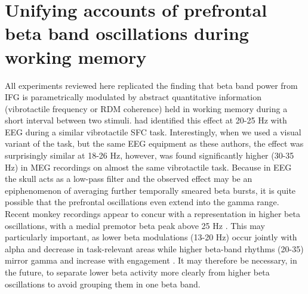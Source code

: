 \section{Unifying accounts of prefrontal beta band oscillations during working memory}

All experiments reviewed here replicated the finding that beta band power from IFG is parametrically modulated by abstract quantitative information (vibrotactile frequency or RDM coherence) held in working memory during a short interval between two stimuli. \textcite{Spitzer2010} had identified this effect at 20-25 Hz with EEG during a similar vibrotactile SFC task. Interestingly, when we used a visual variant of the task, but the same EEG equipment as these authors, the effect was surprisingly similar at 18-26 Hz, however, was found significantly higher (30-35 Hz) in MEG recordings on almost the same vibrotactile task. Because in EEG the skull acts as a low-pass filter \parencite{Pfurtscheller1975} and the observed effect may be an epiphenomenon of averaging further temporally smeared beta bursts, it is quite possible that the prefrontal oscillations even extend into the gamma range. Recent monkey recordings appear to concur with a representation in higher beta oscillations, with a medial premotor beta peak above 25 Hz \parencite{Haegens2017}. This may particularly important, as lower beta modulations (13-20 Hz) occur jointly with alpha \parencite{Hanslmayr2009} and decrease in task-relevant areas while higher beta-band rhythms (20-35) mirror gamma and increase with engagement \parencite{Tallon-Baudry1998}. It may therefore be necessary, in the future, to separate lower beta activity more clearly from higher beta oscillations to avoid grouping them in one beta band.

